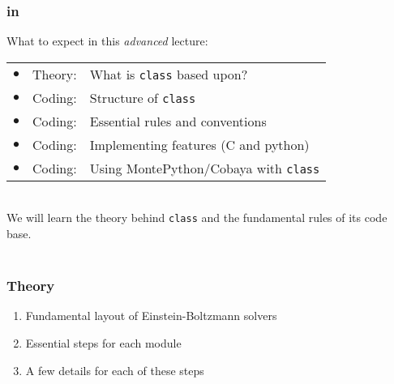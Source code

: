 






\scriptsize

\begin{frame}[fragile]
\frametitle{{\Red \CLASS{}} in \location}

\mbox{}
What to expect in this {\itshape advanced} lecture:
\vspace*{0.5\baselineskip}\mbox{}
\bgroup 
\def\arraystretch{1.15}
\begin{tabular}{lll}
	$\bullet$&Theory:& What is {\Red \tt class} based upon?\\
	$\bullet$&Coding:& Structure of {\Red \tt class}\\
	$\bullet$&Coding:& Essential rules and conventions\\
	$\bullet$&Coding:& Implementing features (C and python)\\
	$\bullet$&Coding:& Using MontePython/Cobaya with {\Red \tt class}
\end{tabular}
\egroup

\mbox{}\\
We will learn {\Red the theory behind \tt class} and the fundamental rules of its {\Red code base}.\\\mbox{}\\

\end{frame}

\begin{frame}[fragile]
\frametitle{{\Red \CLASS{}} Theory}

\begin{enumerate}
	\item Fundamental layout of Einstein-Boltzmann solvers
	\item Essential steps for each module
	\item A few details for each of these steps
\end{enumerate}

\end{frame}

